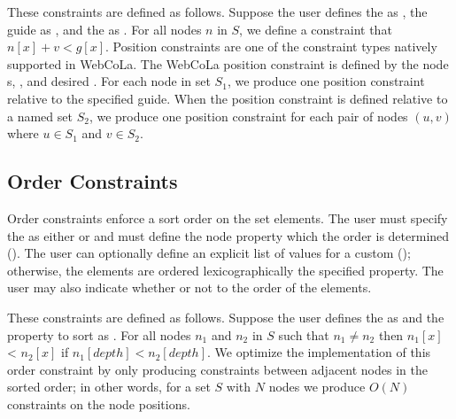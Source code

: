 These constraints are defined as follows. Suppose the user defines the
 as ,
the guide as , and the  as . For all nodes $n$
in $S$, we define a constraint that \mbox{$n[x] + v < g[x]$}.
Position constraints are one of the constraint types natively supported in
WebCoLa. The WebCoLa position constraint is defined by the node 
s, , and desired . For each node
in set $S_1$, we produce one position constraint relative to the specified guide.
When the position constraint is defined relative to a named set $S_2$,
we produce one position constraint for each pair of nodes $(u, v)$ where $u \in S_1$ and $v \in S_2$.

\subsection{Order Constraints}
Order constraints enforce a sort order on the set elements. The user must 
specify the  as either  or  and must define
the node property  which the order is determined 
(). 
The user can optionally define an explicit list of values for a custom
 (); 
otherwise, the elements are ordered lexicographically 
the specified property. The user may also indicate whether
or not to  the order of the elements.

These constraints are defined as follows.  Suppose the user defines the  as
 and the property to sort  as . For all nodes $n_1$ 
and $n_2$ in $S$  such that $n_1 \neq n_2$ then $n_1[x]$ < $n_2[x]$
if $n_1[depth] < n_2[depth]$. We optimize the implementation of this order
constraint by only producing constraints between adjacent nodes in the sorted 
order; in other words, for a set $S$ with $N$ nodes we produce $O(N)$ 
constraints on the node positions.

